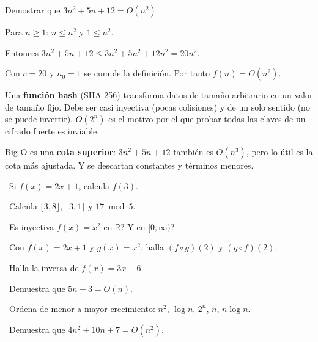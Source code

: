 \begin{tmejemplo}{Demostrar que $3n^2+5n+12=O(n^2)$}
\begin{tmpasos}
\item Para $n\ge1$: $n\le n^2$ y $1\le n^2$.
\item Entonces $3n^2+5n+12\le3n^2+5n^2+12n^2=20n^2$.
\item Con $c=20$ y $n_0=1$ se cumple la definici\'on. Por tanto $f(n)=O(n^2)$.
\end{tmpasos}
\end{tmejemplo}

\begin{tmsistemas}
Una \textbf{funci\'on hash} (SHA-256) transforma datos de tama\~no arbitrario en un valor de tama\~no fijo. Debe ser casi inyectiva (pocas colisiones) y de un solo sentido (no se puede invertir). $O(2^n)$ es el motivo por el que probar todas las claves de un cifrado fuerte es inviable.
\end{tmsistemas}

\begin{tmcuidado}Big-O es una \textbf{cota superior}: $3n^2+5n+12$ tambi\'en es $O(n^3)$, pero lo \'util es la cota m\'as ajustada. Y se descartan constantes y t\'erminos menores.\end{tmcuidado}

\begin{tmejercicios}
\label{ej:1-4}
\begin{tmlista}
\item \tmbasico\ Si $f(x)=2x+1$, calcula $f(3)$.
\item \tmbasico\ Calcula $\lfloor3{,}8\rfloor$, $\lceil3{,}1\rceil$ y $17\bmod5$.
\item \tmbasico\ \textquestiondown Es inyectiva $f(x)=x^2$ en $\mathbb R$? \textquestiondown Y en $[0,\infty)$?
\item \tmmedio\ Con $f(x)=2x+1$ y $g(x)=x^2$, halla $(f\circ g)(2)$ y $(g\circ f)(2)$.
\item \tmmedio\ Halla la inversa de $f(x)=3x-6$.
\item \tmmedio\ Demuestra que $5n+3=O(n)$.
\item \tmdificil\ Ordena de menor a mayor crecimiento: $n^2$, $\log n$, $2^n$, $n$, $n\log n$.
\item \tmdificil\ Demuestra que $4n^2+10n+7=O(n^2)$.
\end{tmlista}
\end{tmejercicios}

